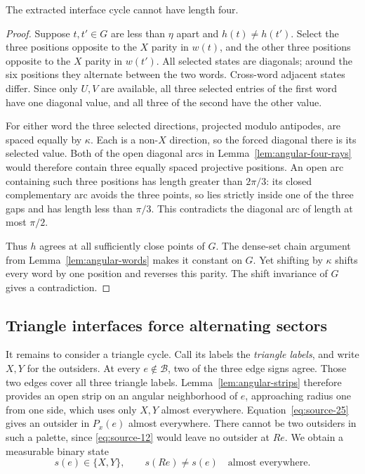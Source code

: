 \begin{proposition}\label{prop:angular-four}
The extracted interface cycle cannot have length four.
\end{proposition}

\begin{proof}
Suppose \(t,t'\in G\) are less than \(\eta\) apart and
\(h(t)\ne h(t')\).  Select the three positions opposite to
the \(X\) parity in \(w(t)\), and the other three positions
opposite to the \(X\) parity in \(w(t')\).  All selected
states are diagonals; around the six positions they alternate
between the two words.  Cross-word adjacent states differ.
Since only \(U,V\) are available, all three selected entries
of the first word have one diagonal value, and all three
of the second have the other value.

For either word the three selected directions, projected
modulo antipodes, are spaced equally by \(\kappa\).  Each
is a non-\(X\) direction, so the forced diagonal there is
its selected value.  Both of the open diagonal arcs in
Lemma~\ref{lem:angular-four-rays} would therefore contain
three equally spaced projective positions.  An open arc
containing such three positions has length greater than
\(2\pi/3\): its closed complementary arc avoids the three
points, so lies strictly inside one of the three gaps and
has length less than \(\pi/3\).  This contradicts
the diagonal arc of length at most \(\pi/2\).

Thus \(h\) agrees at all sufficiently close points of \(G\).
The dense-set chain argument from
Lemma~\ref{lem:angular-words} makes it constant on \(G\).
Yet shifting by \(\kappa\) shifts every word by one position
and reverses this parity.  The shift invariance of \(G\)
gives a contradiction.
\end{proof}

\subsection{Triangle interfaces force alternating sectors}

It remains to consider a triangle cycle.  Call its labels the
\emph{triangle labels}, and write \(X,Y\) for the outsiders.
At every \(e\notin\mathcal B\), two of the three edge signs
agree.  Those two edges cover all three triangle labels.
Lemma~\ref{lem:angular-strips} therefore provides an open
strip on an angular neighborhood of \(e\), approaching radius
one from one side, which uses only \(X,Y\) almost everywhere.
Equation~\eqref{eq:source-25} gives an outsider in \(P_x(e)\)
almost everywhere.  There cannot be two outsiders in such
a palette, since \eqref{eq:source-12} would leave no outsider
at \(Re\).  We obtain a measurable binary state
\[
 s(e)\in\{X,Y\},\qquad s(Re)\ne s(e)
 \quad\text{almost everywhere}.
\]

